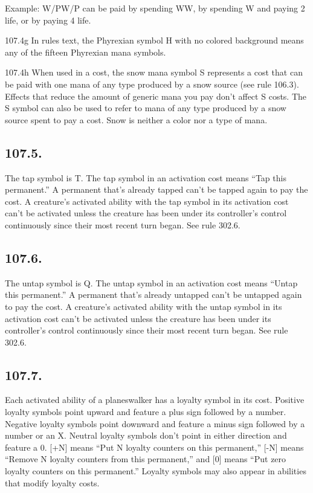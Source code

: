 Example: {W/P}{W/P} can be paid by spending {W}{W}, by spending {W} and paying 2 life, or by paying 4 life.

107.4g In rules text, the Phyrexian symbol {H} with no colored background means any of the fifteen Phyrexian mana symbols.

107.4h When used in a cost, the snow mana symbol {S} represents a cost that can be paid with one mana of any type produced by a snow source (see rule 106.3). Effects that reduce the amount of generic mana you pay don’t affect {S} costs. The {S} symbol can also be used to refer to mana of any type produced by a snow source spent to pay a cost. Snow is neither a color nor a type of mana.

\subsection*{107.5.}
The tap symbol is {T}. The tap symbol in an activation cost means “Tap this permanent.” A permanent that’s already tapped can’t be tapped again to pay the cost. A creature’s activated ability with the tap symbol in its activation cost can’t be activated unless the creature has been under its controller’s control continuously since their most recent turn began. See rule 302.6.

\subsection*{107.6.}
The untap symbol is {Q}. The untap symbol in an activation cost means “Untap this permanent.” A permanent that’s already untapped can’t be untapped again to pay the cost. A creature’s activated ability with the untap symbol in its activation cost can’t be activated unless the creature has been under its controller’s control continuously since their most recent turn began. See rule 302.6.

\subsection*{107.7.}
Each activated ability of a planeswalker has a loyalty symbol in its cost. Positive loyalty symbols point upward and feature a plus sign followed by a number. Negative loyalty symbols point downward and feature a minus sign followed by a number or an X. Neutral loyalty symbols don’t point in either direction and feature a 0. [+N] means “Put N loyalty counters on this permanent,” [-N] means “Remove N loyalty counters from this permanent,” and [0] means “Put zero loyalty counters on this permanent.” Loyalty symbols may also appear in abilities that modify loyalty costs.

